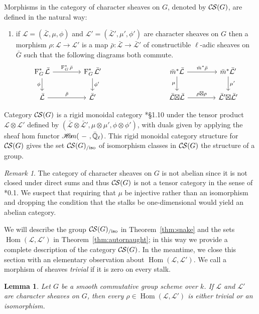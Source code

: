 \documentclass[10pt]{amsart}
\makeatletter
\theoremstyle{plain}
\newtheorem{lemma}[theorem]{Lemma}
\theoremstyle{definition}
\theoremstyle{remark}
\newtheorem{remark}[theorem]{Remark}
\newcommand{\EE}{\mathbb{\bar Q}_\ell}
\newcommand{\Fq}{k}
\newcommand{\Frob}[1]{\operatorname{F}_{#1}}
\DeclareMathOperator{\Hom}{Hom}
\newcommand{\sheafHom}{{\mathscr{H}\hskip-4pt{\it o}\hskip-2pt{\it m}}}
\newcommand{\cs}[1]{{\mathcal{#1}}}
\newcommand{\gcs}[1]{{\mathcal{\bar #1}}}
\newcommand{\CS}{{\mathcal{C\hskip-0.8pt S}}}
\newcommand{\CSiso}[1]{\CS(#1)_{/\text{iso}}}
\newcommand{\labitem}[2]{
\def\@itemlabel{\textbf{#1}}
\item
\def\@currentlabel{#1}\label{#2}}
\newcommand{\bm}{\bar{m}}
\newcommand{\bG}{\bar{G}}
\newcommand{\brho}{{\bar\rho}}
\newcommand{\tight}[3]{\hspace{-#1pt}{#2}\hspace{-#3pt}}
\newcommand{\LxL}{\text{$\gcs{L} \tight{0}{\boxtimes}{0} \gcs{L}$}}
\makeatother
\begin{document}
Morphisms in the category of character sheaves on $G$, denoted by $\CS(G)$, are defined in the natural way:
\begin{enumerate}
\labitem{(CS.4)}{CS.4} if $\cs{L} = (\gcs{L},\mu,\phi)$ and
  $\cs{L'} = (\gcs{L'},\mu',\phi')$ are character sheaves on $G$ then
  a morphism $\rho : \cs{L} \to \cs{L}'$ is a map $\brho : \gcs{L} \to \gcs{L'}$
  of constructible $\ell$-adic sheaves on $\bG$ such that the following diagrams both commute.
  \[
  \begin{tikzcd}[column sep=40]
  \Frob{G}^* \gcs{L} \rar{\Frob{G}^* \brho} \arrow[swap]{d}{\phi} & \Frob{G}^* \gcs{L'} \dar{\phi'}
  & & \arrow[swap]{d}{\mu} \bm^* \gcs{L} \rar{\bm^* \brho} & \bm^* \gcs{L'} \dar{\mu'} \\
  \gcs{L} \rar{\brho} & \gcs{L'}
  & {} & \LxL \rar{\tight{1}{\rho\boxtimes \rho}{1}} & \gcs{L'} \tight{0}{\boxtimes}{0} \gcs{L'}
  \end{tikzcd}
  \]
\end{enumerate}

Category $\CS(G)$ is a rigid monoidal category
\cite{etingof:09a}*{\S1.10} under the tensor product
$\cs{L} \otimes \cs{L'}$ defined by $(\gcs{L}\otimes\gcs{L'}, \mu\otimes\mu', \phi\otimes \phi')$,
with duals given by applying the sheaf hom functor
$\sheafHom(\ - \ ,\EE)$.
This rigid monoidal category structure for $\CS(G)$ gives the set $\CSiso{G}$
of isomorphism classes in $\CS(G)$ the structure of a group.

\begin{remark}
The category of character sheaves on $G$ is not abelian since it is not closed under direct sums and thus $\CS(G)$
is not a tensor category in the sense of \cite{deligne:02a}*{0.1}.  We suspect that requiring that $\mu$ be injective rather than
an isomorphism and dropping the condition that the stalks be one-dimensional would yield an abelian category.
\end{remark}

We will describe the group $\CSiso{G}$ in Theorem~\ref{thm:snake}
and the sets $\Hom(\cs{L},\cs{L}')$ in Theorem~\ref{thm:autornaught}; in this way we provide a complete description of the category $\CS(G)$.
%
In the meantime, we close this section with an elementary observation about $\Hom(\cs{L},\cs{L}')$.
We call a morphism of sheaves \emph{trivial} if it is zero on every stalk.

\begin{lemma}\label{lem:autornaught}
Let $G$ be a smooth commutative group scheme over $\Fq$.
If $\cs{L}$ and $\cs{L}'$ are character sheaves on $G$, then
every $\rho\in \Hom(\cs{L},\cs{L}')$ is either trivial or an isomorphism. 
\end{lemma}
\end{document}
